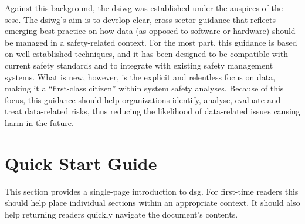 Against this background, the \gls{dsiwg} was established under the auspices of the \gls{scsc}. The \gls{dsiwg}'s aim is to develop clear, cross-sector guidance that reflects emerging best practice on how data (as opposed to software or hardware) should be managed in a safety-related context.
For the most part, this guidance is based on well-established techniques,
and it has been designed to be compatible with current safety standards and to integrate with existing safety management systems.
What is new, however, is the explicit and relentless focus on data, making it a ``first-class citizen'' within system safety analyses.
\cbstart Because of this focus\cbend, this guidance should help organizations identify, analyse, evaluate and treat data-related risks, thus reducing the likelihood of data-related issues causing harm in the future.

\clearpage
\section*{Quick Start Guide}
\pagestyle{ContinuationPageFrontMatter}


\cbstart This section provides a single-page introduction to \gls{dsg}. For first-time readers this should help place individual sections within an appropriate context. It should also help returning readers quickly navigate the document's contents.\cbend\

